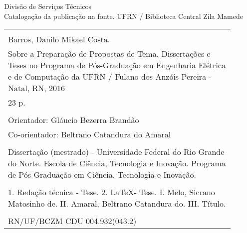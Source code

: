%
%

\newpage

\begin{center}

\vspace*{\fill}

Divisão de Serviços Técnicos\\[1ex]
Catalogação da publicação na fonte.
UFRN / Biblioteca Central Zila Mamede

\vspace{2ex}

\begin{tabular}{|p{0.9\linewidth}|} \hline
\\
Barros, Danilo Mikael Costa.\\
\hspace{1em} Sobre a Preparação de Propostas de Tema, Dissertações
e Teses no Programa de Pós-Graduação em Engenharia Elétrica e de Computação da UFRN /
Fulano dos Anzóis Pereira - Natal, RN, 2016 \\
\hspace{1em} 23 p. \\
\\
\hspace{1em} Orientador: Gláucio Bezerra Brandão \\
\hspace{1em} Co-orientador: Beltrano Catandura do Amaral \\
\\
\hspace{1em} Dissertação (mestrado) - Universidade Federal do Rio Grande do Norte.
Escola de Ciência, Tecnologia e Inovação. Programa de Pós-Graduação em Ciência, Tecnologia e Inovação. \\
\\
\hspace{1em} 1. Redação técnica - Tese. 2. \LaTeX - Tese.
I. Melo, Sicrano Matosinho de. II. Amaral, Beltrano Catandura do.
III. Título. \\
\\
RN/UF/BCZM \hfill CDU 004.932(043.2) \\ \hline
\end{tabular} 

\end{center}
